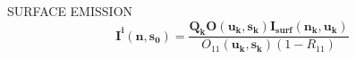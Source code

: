 \begin{minipage}{7cm}
\begin{sf}
SURFACE EMISSION
\[
\mathbf{I^i(n,s_0)}=\frac{\mathbf{Q_kO(u_k,s_k)I_{surf}(n_k,u_k)}}{O_{11}(\mathbf{u_{k},s_k})\left(1-R_{11}\right)}
\]
\end{sf}
\end{minipage}

